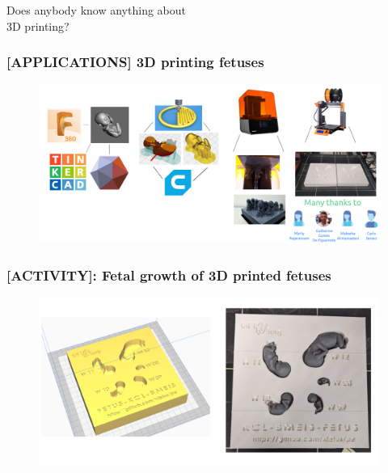 {
\begin{frame}{}

\BigSizeFont
\begin{center}
    Does anybody know anything about \\ 3D printing?
\end{center}

\end{frame}
}


{
\begin{frame}
  \frametitle{[\faUserMd APPLICATIONS] 3D printing fetuses}
  \vspace{10pt}
        \begin{figure}
        \centering
        \includegraphics[width=1.0\textwidth]{./../figures/3d-printing/why-and-how/versions/drawing-v05.png}
      \end{figure}

\end{frame}
}

{
\begin{frame}
  \frametitle{[\faUsers ACTIVITY]: Fetal growth of 3D printed fetuses}
  \vspace{10pt}
        \begin{figure}
        \centering
        \includegraphics[width=0.99\textwidth]{./../figures/3d-printing/cads-prints/versions/drawing-v02.png}
      \end{figure}

\end{frame}
}

